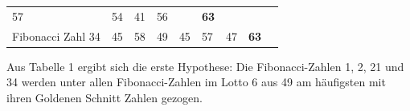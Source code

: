 \documentclass[ngerman,]{article}
\begin{document}
\begin{longtable}[]{@{}lllllllll@{}}
\begin{minipage}[t]{0.07\columnwidth}
57\strut
\end{minipage} & \begin{minipage}[t]{0.07\columnwidth}\raggedright\strut
54\strut
\end{minipage} & \begin{minipage}[t]{0.07\columnwidth}\raggedright\strut
41\strut
\end{minipage} & \begin{minipage}[t]{0.07\columnwidth}\raggedright\strut
56\strut
\end{minipage} & \begin{minipage}[t]{0.07\columnwidth}\raggedright\strut
\strut
\end{minipage} & \begin{minipage}[t]{0.07\columnwidth}\raggedright\strut
\textbf{63}\strut
\end{minipage}\tabularnewline
\begin{minipage}[t]{0.19\columnwidth}\raggedright\strut
Fibonacci Zahl 34\strut
\end{minipage} & \begin{minipage}[t]{0.07\columnwidth}\raggedright\strut
45\strut
\end{minipage} & \begin{minipage}[t]{0.07\columnwidth}\raggedright\strut
58\strut
\end{minipage} & \begin{minipage}[t]{0.07\columnwidth}\raggedright\strut
49\strut
\end{minipage} & \begin{minipage}[t]{0.07\columnwidth}\raggedright\strut
45\strut
\end{minipage} & \begin{minipage}[t]{0.07\columnwidth}\raggedright\strut
57\strut
\end{minipage} & \begin{minipage}[t]{0.07\columnwidth}\raggedright\strut
47\strut
\end{minipage} & \begin{minipage}[t]{0.07\columnwidth}\raggedright\strut
\textbf{63}\strut
\end{minipage} & \begin{minipage}[t]{0.07\columnwidth}\raggedright\strut
\strut
\end{minipage}\tabularnewline
\bottomrule
\end{longtable}

Aus Tabelle 1 ergibt sich die erste Hypothese: Die Fibonacci-Zahlen 1,
2, 21 und 34 werden unter allen Fibonacci-Zahlen im Lotto 6 aus 49 am
häufigsten mit ihren Goldenen Schnitt Zahlen gezogen.
\end{document}
